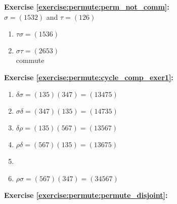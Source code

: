 \noindent\textbf{Exercise \ref{exercise:permute:perm_not_comm}:}\\
$\sigma = (1532)$ and $\tau = (126)$
\begin{enumerate}[{a.}]
\item
$\tau\sigma = (1536)$

\item
$\sigma\tau = (2653)$\\
commute
\end{enumerate}

\noindent\textbf{Exercise \ref{exercise:permute:cycle_comp_exer1}:}
\begin{multicols}{2}
\begin{enumerate}[{a.}]
\item
$\delta \sigma = (135)(347) = (13475)$

\item
$\sigma \delta = (347)(135) = (14735)$

\item
$\delta \rho = (135)(567) = (13567)$

\item
$\rho \delta = (567)(135) = (13675)$

\item

\item
$\rho \sigma = (567)(347) = (34567)$
\end{enumerate}
\end{multicols}

\noindent\textbf{Exercise \ref{exercise:permute:permute_disjoint}:}\\

